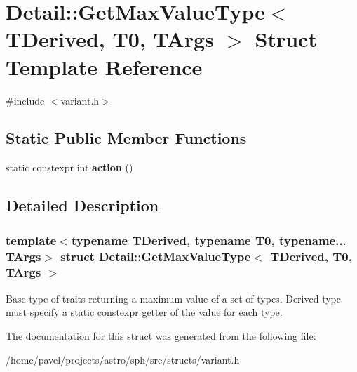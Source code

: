 \hypertarget{structDetail_1_1GetMaxValueType}{}\section{Detail\+:\+:Get\+Max\+Value\+Type$<$ T\+Derived, T0, T\+Args $>$ Struct Template Reference}
\label{structDetail_1_1GetMaxValueType}


{\ttfamily \#include $<$variant.\+h$>$}

\subsection*{Static Public Member Functions}
\begin{DoxyCompactItemize}
\item 
\hypertarget{structDetail_1_1GetMaxValueType_ac53fc582624306d8ffebfcb44d1bb59c}{}\label{structDetail_1_1GetMaxValueType_ac53fc582624306d8ffebfcb44d1bb59c} 
static constexpr int {\bfseries action} ()
\end{DoxyCompactItemize}


\subsection{Detailed Description}
\subsubsection*{template$<$typename T\+Derived, typename T0, typename... T\+Args$>$\newline
struct Detail\+::\+Get\+Max\+Value\+Type$<$ T\+Derived, T0, T\+Args $>$}

Base type of traits returning a maximum value of a set of types. Derived type must specify a static constexpr getter of the value for each type. 

The documentation for this struct was generated from the following file\+:\begin{DoxyCompactItemize}
\item 
/home/pavel/projects/astro/sph/src/structs/variant.\+h\end{DoxyCompactItemize}
